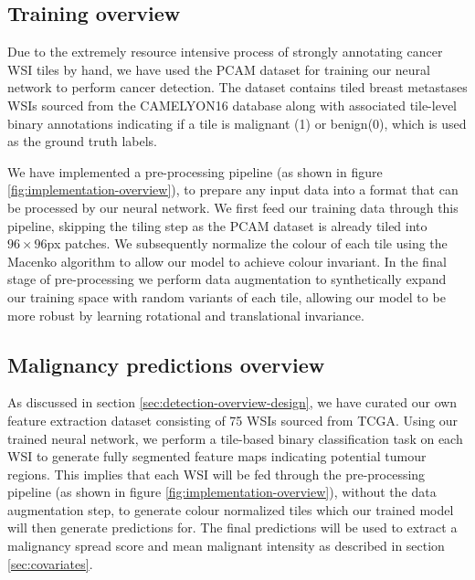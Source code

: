 \documentclass{l4proj}
\begin{document}
\subsection{Training overview}
Due to the extremely resource intensive process of strongly annotating cancer WSI tiles by hand, we have used the PCAM dataset for training our neural network to perform cancer detection. The dataset contains tiled breast metastases WSIs sourced from the CAMELYON16 database along with associated tile-level binary annotations indicating if a tile is malignant (1) or benign(0), which is used as the ground truth labels.

We have implemented a pre-processing pipeline (as shown in figure \ref{fig:implementation-overview}),  to prepare any input data into a format that can be processed by our neural network. We first feed our training data through this pipeline, skipping the tiling step as the PCAM dataset is already tiled into \(96 \times 96\)px patches. We subsequently normalize the colour of each tile using the Macenko algorithm to allow our model to achieve colour invariant. In the final stage of pre-processing we perform data augmentation to synthetically expand our training space with random variants of each tile, allowing our model to be more robust by learning rotational and translational invariance.

\subsection{Malignancy predictions overview}
As discussed in section \ref{sec:detection-overview-design}, we have curated our own feature extraction dataset consisting of 75 WSIs sourced from TCGA. Using our trained neural network, we perform a tile-based binary classification task on each WSI to generate fully segmented feature maps indicating potential tumour regions. This implies that each WSI will be fed through the pre-processing pipeline (as shown in figure \ref{fig:implementation-overview}), without the data augmentation step, to generate colour normalized tiles which our trained model will then generate predictions for. The final predictions will be used to extract a malignancy spread score and mean malignant intensity as described in section \ref{sec:covariates}.
\end{document}
